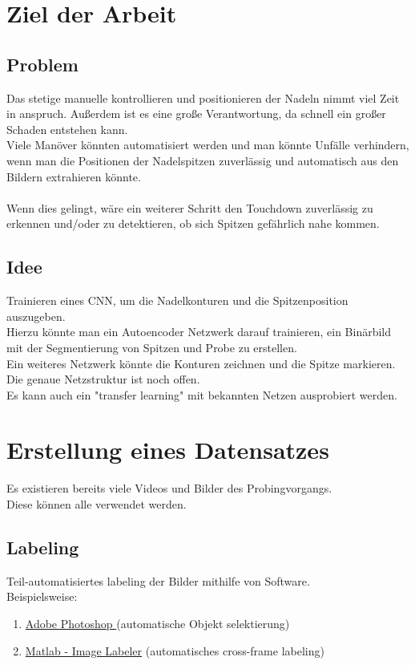 \documentclass{article}
\begin{document}
	\section{Ziel der Arbeit}
	\subsection{Problem}
	Das stetige manuelle kontrollieren und positionieren der Nadeln nimmt viel Zeit in anspruch.
	Außerdem ist es eine große Verantwortung, da schnell ein großer Schaden entstehen kann.\\
	Viele Manöver könnten automatisiert werden und man könnte Unfälle verhindern, wenn man die Positionen der Nadelspitzen zuverlässig und automatisch aus den Bildern extrahieren könnte.\\
	\\
	Wenn dies gelingt, wäre ein weiterer Schritt den Touchdown zuverlässig zu erkennen und/oder zu detektieren, ob sich Spitzen gefährlich nahe kommen.
	\subsection{Idee}
	Trainieren eines CNN, um die Nadelkonturen und die Spitzenposition auszugeben.\\
	Hierzu könnte man ein Autoencoder Netzwerk darauf trainieren, ein Binärbild mit der Segmentierung von Spitzen und Probe zu erstellen.\\
	Ein weiteres Netzwerk könnte die Konturen zeichnen und die Spitze markieren.\\
	Die genaue Netzstruktur ist noch offen.\\
	Es kann auch ein "transfer learning" mit bekannten Netzen ausprobiert werden.

	\section{Erstellung eines Datensatzes}
	Es existieren bereits viele Videos und Bilder des Probingvorgangs.\\
	Diese können alle verwendet werden.
	\subsection{Labeling}
	Teil-automatisiertes labeling der Bilder mithilfe von Software.\\
	Beispielsweise:
	\begin{enumerate}
		\item \href{https://www.adobe.com/products/photoshop.html}{Adobe Photoshop } (automatische Objekt selektierung)
		\item \href{https://www.mathworks.com/help/vision/ref/imagelabeler-app.html}{Matlab - Image Labeler} (automatisches cross-frame labeling)
	\end{enumerate} 
\end{document}
